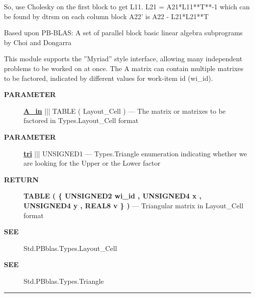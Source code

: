  So, use Cholesky on the first block to get L11. L21 = A21*L11**T**-1 which can be found by dtrsm on each column block A22' is A22 - L21*L21**T 
\par
 Based upon PB-BLAS: A set of parallel block basic linear algebra subprograms by Choi and Dongarra 


\par
 This module supports the ''Myriad'' style interface, allowing many independent problems to be worked on at once. The A matrix can contain multiple matrixes to be factored, indicated by different values for work-item id (wi\_id).








\par
\begin{description}
\item [\colorbox{tagtype}{\color{white} \textbf{\textsf{PARAMETER}}}] \textbf{\underline{A\_in}} ||| TABLE ( Layout\_Cell ) --- The matrix or matrixes to be factored in Types.Layout\_Cell format
\item [\colorbox{tagtype}{\color{white} \textbf{\textsf{PARAMETER}}}] \textbf{\underline{tri}} ||| UNSIGNED1 --- Types.Triangle enumeration indicating whether we are looking for the Upper or the Lower factor
\end{description}







\par
\begin{description}
\item [\colorbox{tagtype}{\color{white} \textbf{\textsf{RETURN}}}] \textbf{TABLE ( \{ UNSIGNED2 wi\_id , UNSIGNED4 x , UNSIGNED4 y , REAL8 v \} )} --- Triangular matrix in Layout\_Cell format
\end{description}






\par
\begin{description}
\item [\colorbox{tagtype}{\color{white} \textbf{\textsf{SEE}}}] Std.PBblas.Types.Layout\_Cell
\item [\colorbox{tagtype}{\color{white} \textbf{\textsf{SEE}}}] Std.PBblas.Types.Triangle
\end{description}




\rule{\linewidth}{0.5pt}
